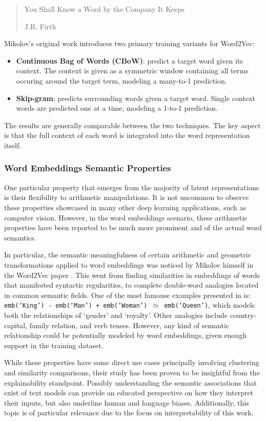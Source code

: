 \blockquote[J.R. Firth]{You Shall Know a Word by the Company It Keeps}

Mikolov's original work introduces two primary training variants for Word2Vec:
\begin{itemize}
    \item \textbf{Continuous Bag of Words (CBoW)}: predict a target word given its context.
The context is given as a symmetric window containing all terms occuring around the target term, modeling a many-to-1 prediction.
    \item \textbf{Skip-gram}: predicts surrounding words given a target word.
Single context words are predicted one at a time, modeling a 1-to-1 prediction.
\end{itemize}
The results are generally comparable between the two techniques.
The key aspect is that the full context of each word is integrated into the word representation itself.

\subsubsection*{Word Embeddings Semantic Properties}

One particular property that emerges from the majority of latent representations is their flexibility to arithmetic manipulations.
It is not uncommon to observe these properties showcased in many other deep learning applications, such as computer vision.
However, in the word embeddings scenario, these arithmetic properties have been reported to be much more prominent and  of the actual word semantics.

In particular, the semantic meaningfulness of certain arithmetic and geometric transformations applied to word embeddings was noticed by Mikolov himself in the Word2Vec paper \cite{mikolov2013}.
This went from finding similarities in embeddings of words that manifested syntactic regularities, to complete double-word analogies located in common semantic fields.
One of the most famouse examples presented in \cite{mikolov2013} is: \texttt{emb(`King') - emb(`Man') + emb(`Woman') $\simeq$ emb(`Queen')}, which models both the relationships of `gender' and `royalty'.
Other  analogies include country-capital, family relation, and verb tenses.
However, any kind of semantic relationship could be potentially modeled by word embeddings, given enough support in the training dataset.

While these properties have some direct use cases principally involving clustering and similarity comparisons, their study has been proven to be insightful from the explainability standpoint.
Possibly understanding the semantic associations that exist  of text models can provide an educated perspective on how they interpret their inputs, but also underline human and language biases.
Additionally, this topic is of particular relevance due to the focus on interpretability of this work.

